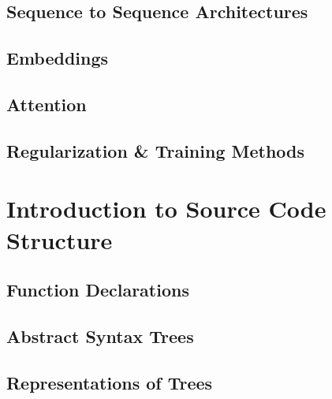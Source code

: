 \subsection{Sequence to Sequence Architectures} %
\label{sub:sequence_to_sequence_architectures}

\subsection{Embeddings} %
\label{sub:embeddings}

\subsection{Attention} %

\blindtext


\subsection{Regularization \& Training Methods} %




\section{Introduction to Source Code Structure} %
\label{sec:translating_code}

\subsection{Function Declarations} %
\label{sub:function_declarations}

\subsection{Abstract Syntax Trees} %
\label{sub:abstract_syntax_trees}

\subsection{Representations of Trees}

